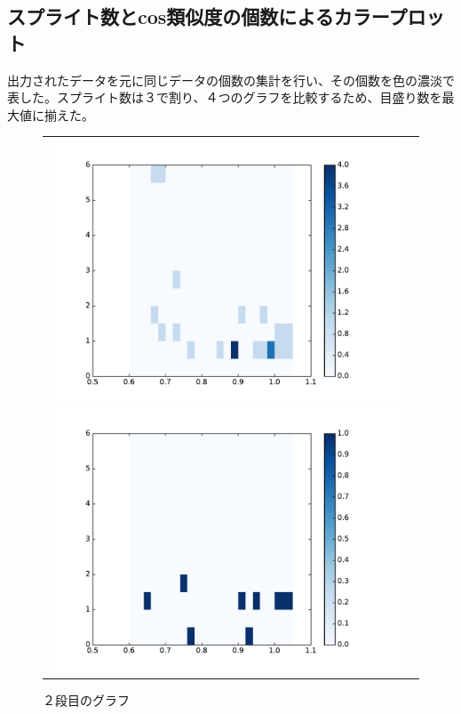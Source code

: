 \documentclass[a4paper,10pt,onecolumn,oneside,openany]{jsbook}
\begin{document}
 
 \newpage
  \subsection{スプライト数とcos類似度の個数によるカラープロット}
出力されたデータを元に同じデータの個数の集計を行い、その個数を色の濃淡で表した。スプライト数は３で割り、４つのグラフを比較するため、目盛り数を最大値に揃えた。 
 
\begin{figure}[h]
 \begin{tabular}{cc}
 	\begin{minipage}[t]{0.45\hsize}
	 \centering
	 \includegraphics[keepaspectratio, scale = 0.35]{colormap_maze_splite_1.pdf}
	 \caption{１段目のグラフ}
	 \label{first_maze_splite_color}
	\end{minipage}
        \begin{minipage}[t]{0.45\hsize}
	 \centering
	 \includegraphics[keepaspectratio, scale = 0.35]{colormap_maze_splite_2.pdf}
	 \caption{２段目のグラフ}
	 \label{second_maze_splite_color}
	\end{minipage}
 \end{tabular}
 \end{figure}
\end{document}
